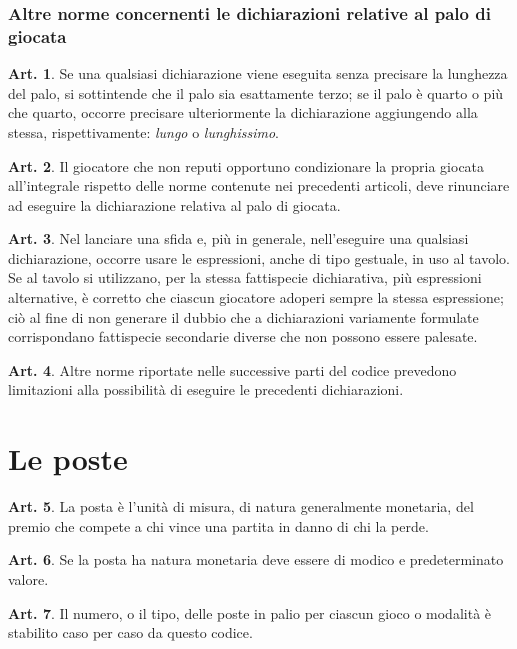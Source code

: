 \documentclass[italian,a4paper]{article}
\theoremstyle{definition}
\newtheorem{art}{Art.}
\begin{document}
\subsubsection{Altre norme concernenti le dichiarazioni relative al palo di
giocata}
\begin{art}
    Se una qualsiasi dichiarazione viene eseguita senza precisare la lunghezza del palo, si sottintende che il palo sia esattamente terzo; se il palo è quarto o più che quarto, occorre precisare ulteriormente la dichiarazione aggiungendo alla stessa, rispettivamente: \emph{lungo} o  \emph{lunghissimo}.
\end{art}
\begin{art}
    Il giocatore che non reputi opportuno condizionare la propria giocata all'integrale rispetto delle norme contenute nei precedenti articoli, deve  rinunciare ad eseguire la dichiarazione relativa al palo di giocata.
\end{art}
\begin{art}
    Nel lanciare una sfida e, più in generale, nell'eseguire una qualsiasi dichiarazione, occorre usare le espressioni, anche di tipo gestuale, in uso al tavolo.
    Se al tavolo si utilizzano, per la stessa fattispecie dichiarativa, più espressioni alternative, è corretto che ciascun giocatore adoperi sempre la stessa espressione; ciò al fine di non generare il dubbio che a dichiarazioni variamente formulate corrispondano fattispecie secondarie diverse che non possono essere palesate.
\end{art}
\begin{art}
    Altre norme riportate nelle successive parti del codice prevedono limitazioni alla possibilità di eseguire le precedenti dichiarazioni.
\end{art}
\section{Le poste}
\begin{art}
    La posta è l'unità di misura, di natura generalmente monetaria, del premio che compete a chi vince una partita in danno di chi la perde.
\end{art}
\begin{art}
    Se la posta ha natura monetaria deve essere di modico e predeterminato valore.
\end{art}
\begin{art}
    Il numero, o il tipo, delle poste in palio per ciascun gioco o modalità è stabilito caso per caso da questo codice.
\end{art}
\end{document}
